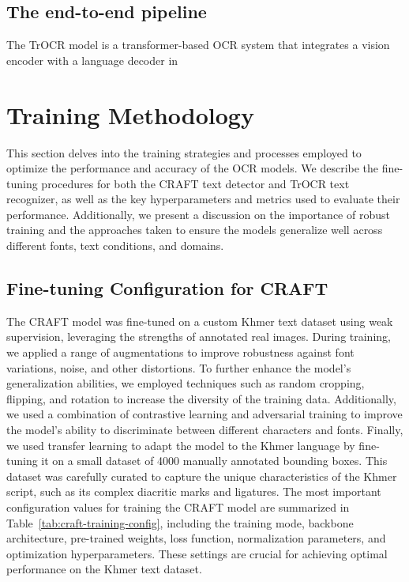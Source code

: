 \subsection{The end-to-end pipeline}
\label{subsec:khmer-ocr-pipeline}
The TrOCR model is a transformer-based OCR system that integrates a vision
 encoder with a language decoder in

\section{Training Methodology}
\label{sec:training}
This section delves into the training strategies and processes employed to optimize 
the performance and accuracy of the OCR models. We describe the fine-tuning procedures 
for both the CRAFT text detector and TrOCR text recognizer, as well as the key 
hyperparameters and metrics used to evaluate their performance. Additionally, we 
present a discussion on the importance of robust training and the approaches taken 
to ensure the models generalize well across different fonts, text conditions, and 
domains.



\subsection{Fine-tuning Configuration for CRAFT}
\label{subsec:craft-training}

The CRAFT model was fine-tuned on a custom Khmer text dataset using weak supervision, 
leveraging the strengths of annotated real images. During 
training, we applied a range of augmentations to improve robustness against font 
variations, noise, and other distortions. To further enhance the model's generalization 
abilities, we employed techniques such as random cropping, flipping, and rotation to 
increase the diversity of the training data. Additionally, we used a combination of 
contrastive learning and adversarial training to improve the model's ability to 
discriminate between different characters and fonts. Finally, we used transfer learning 
to adapt the model to the Khmer language by fine-tuning it on a small dataset of 4000 
manually annotated bounding boxes. This dataset was carefully curated to capture the 
unique characteristics of the Khmer script, such as its complex diacritic marks and 
ligatures. The most important configuration values for training the CRAFT model are 
summarized in Table~\ref{tab:craft-training-config}, including the training mode, 
backbone architecture, pre-trained weights, loss function, normalization parameters, 
and optimization hyperparameters. These settings are crucial for achieving optimal 
performance on the Khmer text dataset.

